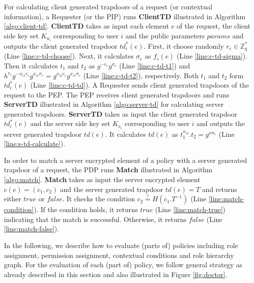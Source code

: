 \documentclass[final,5p,times,twocolumn]{elsarticle}
\begin{document}
For calculating client generated trapdoors of a request (or contextual information), a Requester (or the PIP) runs \textbf{ClientTD} illustrated in Algorithm \ref{algo:client-td}. \textbf{ClientTD} takes as input each element $e$ of the request, the client side key set $K_{u_i}$ corresponding to user $i$ and the public parameters $params$ and outputs the client generated trapdoor $td^*_i (e)$. First, it choose randomly $r_{e} \in \mathbb{Z}^*_q$ (Line \ref{line:c-td-choose}). Next, it calculates ${\sigma}_{e}$ as $f_s (e)$ (Line \ref{line:c-td-sigma}). Then it calculates $t_1$ and $t_2$ as $g^{-r_{e}} g^{{\sigma}_{e}}$ (Line \ref{line:c-td-t1}) and $h^{r_{e}} g^{-x_{i1}r_{e}} g^{x_{i1}{\sigma}_{e}} = g^{x_{i2}r_{e}} g^{x_{i1}{\sigma}_{e}}$ (Line \ref{line:c-td-t2}), respectively. Both $t_1$ and $t_2$ form $td^*_i (e)$ (Line \ref{line:c-td-td}). A Requester sends client generated trapdoors of the request to the PEP.
The PEP receives client generated trapdoors and runs \textbf{ServerTD} illustrated in Algorithm \ref{algo:server-td} for calculating server generated trapdoors. \textbf{ServerTD} takes as input the client generated trapdoor $td^*_i (e)$ and the server side key set $K_{s_i}$ corresponding to user $i$ and outputs the server generated trapdoor $td(e)$. It calculates $td(e)$ as  $t_1^{x_{i2}} . t_2 = g^{x{\sigma}_{e}}$ (Line \ref{line:s-td-calculate}).

In order to match a server encrypted element of a policy with a server generated trapdoor of a request, the PDP runs \textbf{Match} illustrated in Algorithm \ref{algo:match}. \textbf{Match} takes as input the server encrypted element $c(e) = (c_1, c_2)$ and the server generated trapdoor $td(e) = T$ and returns either $\mathit{true}$ or $\mathit{false}$. It checks the condition $c_2 \stackrel{?}{=} H(c_1 . T^{-1})$ (Line \ref{line:match-condition}). If the condition holds, it returns $\mathit{true}$ (Line \ref{line:match-true}) indicating that the match is successful. Otherwise, it returns $\mathit{false}$ (Line \ref{line:match-false}). 

In the following, we describe how to evaluate (parts of) policies including role assignment, permission assignment, contextual conditions and role hierarchy graph. For the evaluation of each (part of) policy, we follow general strategy as already described in this section and also illustrated in Figure \ref{fig:doctor}.
\end{document}
